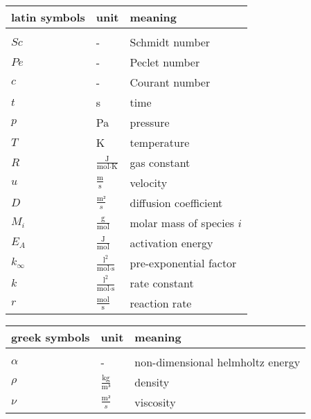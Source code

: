\documentclass[../thesis.tex]{subfiles}
\begin{document}
	

\renewcommand*{\arraystretch}{1.2}
\small
\begin{tabular}{p{4cm}p{3cm}p{8cm}}
	\textbf{latin symbols} & \textbf{unit} & \textbf{meaning} \\ 
	\hline \\[\dimexpr-\normalbaselineskip+2pt]
	$Sc$ & - & Schmidt number \\
	$Pe$ & - & Peclet number \\
	$c$ & - & Courant number \\
	$t$ & s & time \\
	$p$ & Pa & pressure \\
	$T$ & K & temperature \\
	$R$ & $\frac{\text{J}}{\text{mol} \cdot \text{K}}$ & gas constant \\
	$u$ & $\frac{\text{m}}{\text{s}}$ & velocity \\
	$D$ & $\frac{\text{m²}}{s}$ & diffusion coefficient\\
	$M_i$ & $\frac{\text{g}}{\text{mol}}$ & molar mass of species $i$\\
	$E_A$ & $\frac{\text{J}}{\text{mol}}$ & activation energy \\
	$k_{\infty}$ & $\frac{\text{l}^2}{\text{mol} \cdot \text{s}}$ & pre-exponential factor \\
	$k$ & $\frac{\text{l}^2}{\text{mol} \cdot \text{s}}$ & rate constant \\
	$r$ & $\frac{\text{mol}}{\text{s}}$ & reaction rate \\
\end{tabular}
\vspace{1cm}

\small
\begin{tabular}{p{4cm}p{3cm}p{8cm}}
	\textbf{greek symbols} & \textbf{unit} & \textbf{meaning} \\ 
	\hline \\[\dimexpr-\normalbaselineskip+2pt] 
	$\alpha$ & - & non-dimensional helmholtz energy \\
	$\rho$ & $\frac{\text{kg}}{\text{m³}}$ & density \\
	$\nu$ & $\frac{\text{m²}}{s}$ & viscosity\\
\end{tabular}
\vspace{1cm}
\end{document}
